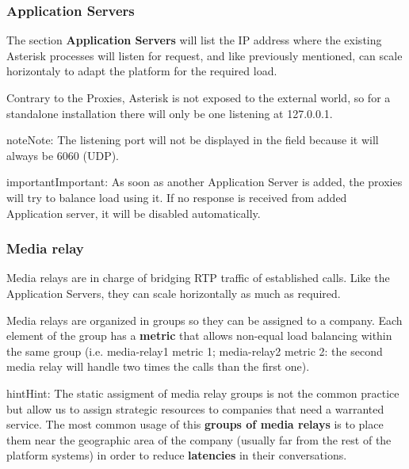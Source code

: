 \documentclass[letterpaper,10pt,english]{sphinxmanual}
\begin{document}
\subsubsection{Application Servers}
\label{internal_calls/god_portal:application-servers}
The section \textbf{Application Servers} will list the IP address where the existing
Asterisk processes will listen for request, and like previously mentioned,
can scale horizontaly to adapt the platform for the required load.

Contrary to the Proxies, Asterisk is not exposed to the external world, so
for a standalone installation there will only be one listening at 127.0.0.1.

\noindent{}

\begin{notice}{note}{Note:}
The listening port will not be displayed in the field because it will
always be 6060 (UDP).
\end{notice}

\begin{notice}{important}{Important:}
As soon as another Application Server is added, the proxies will
try to balance load using it. If no response is received from added
Application server, it will be disabled automatically.
\end{notice}


\subsubsection{Media relay}
\label{internal_calls/god_portal:media-relay}
Media relays are in charge of bridging RTP traffic of established calls. Like
the Application Servers, they can scale horizontally as much as required.

Media relays are organized in groups so they can be assigned to a company. Each
element of the group has a \textbf{metric} that allows non-equal load balancing
within the same group (i.e. media-relay1 metric 1; media-relay2 metric 2:
the second media relay will handle two times the calls than the first one).

\begin{notice}{hint}{Hint:}
The static assigment of media relay groups is not the common practice
but allow us to assign strategic resources to companies that need a warranted
service. The most common usage of this \textbf{groups of media relays} is to
place them near the geographic area of the company (usually far from the
rest of the platform systems) in order to reduce \textbf{latencies} in their
conversations.
\end{notice}
\end{document}
